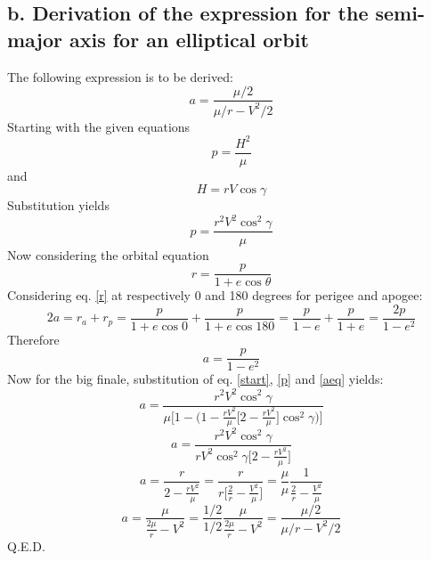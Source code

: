 \subsection{b. Derivation of the expression for the semi-major axis for an elliptical orbit}
The following expression is to be derived:
\begin{equation}
a = \frac{\mu/2}{\mu/r - V^2/2}
\end{equation}
Starting with the given equations
\begin{equation}
p = \frac{H^2}{\mu}
\end{equation}
and
\begin{equation}
H = r V \cos\gamma
\end{equation}
Substitution yields
\begin{equation}
p = \frac{r^2V^2\cos^2\gamma}{\mu}
\label{p}
\end{equation}
Now considering the orbital equation
\begin{equation}
r = \frac{p}{1+e\cos\theta}
\label{r}
\end{equation}
Considering eq. \ref{r} at respectively 0 and 180 degrees for perigee and apogee:
\begin{equation}
2a = r_a + r_p = \frac{p}{1+e\cos0} + \frac{p}{1+e\cos180} = \frac{p}{1-e} + \frac{p}{1+e} = \frac{2p}{1-e^2}
\end{equation}
Therefore
\begin{equation}
a = \frac{p}{1-e^2}
\label{aeq}
\end{equation}
Now for the big finale, substitution of eq. \ref{start}, \ref{p} and \ref{aeq} yields:
\begin{equation}
a = \frac{r^2 V^2 \cos^2 \gamma}{\mu \Bigg[ 1 - \Big(1 - \frac{r V^2}{\mu}\Big[2 - \frac{r V^2}{\mu}\Big]\cos^2\gamma \Big) \Bigg]}
\end{equation}
\begin{equation}
a = \frac{r^2 V^2 \cos^2 \gamma}{r V^2 \cos^2 \gamma \Big[2 - \frac{r V^2}{\mu} \Big]} 
\end{equation}
\begin{equation}
a = \frac{r}{2 - \frac{r V^2}{\mu}} = \frac{r}{r\Big[ \frac{2}{r}-\frac{V^2}{\mu}\Big]} = \frac{\mu}{\mu} \frac{1}{\frac{2}{r} - \frac{V^2}{\mu}}
\end{equation}
\begin{equation}
a = \frac{\mu}{\frac{2\mu}{r} - V^2} = \frac{1/2}{1/2} \frac{\mu}{\frac{2\mu}{r} - V^2} = \frac{\mu/2}{\mu/r - V^2/2}
\end{equation}
Q.E.D.

